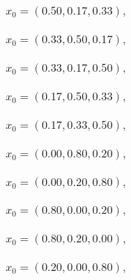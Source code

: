 \documentclass[a4paper]{article}
\begin{document}
\begin{multicols*}{2}
   \subsubsection{\(x_0 = (0.50,0.17,0.33),\quad \)}
   

   \subsubsection{\(x_0 = (0.33,0.50,0.17),\quad \)}
   

   \subsubsection{\(x_0 = (0.33,0.17,0.50),\quad \)}
   

   \subsubsection{\(x_0 = (0.17,0.50,0.33),\quad \)}
   

   \subsubsection{\(x_0 = (0.17,0.33,0.50),\quad \)}
   

   \subsubsection{\(x_0 = (0.00,0.80,0.20),\quad \)}
   

   \subsubsection{\(x_0 = (0.00,0.20,0.80),\quad \)}
   

   \subsubsection{\(x_0 = (0.80,0.00,0.20),\quad \)}
   

   \subsubsection{\(x_0 = (0.80,0.20,0.00),\quad \)}
   

   \subsubsection{\(x_0 = (0.20,0.00,0.80),\quad \)}
   


\end{multicols*}
\end{document}
